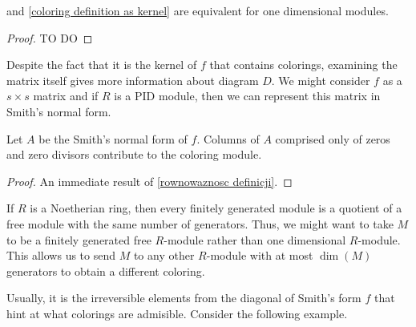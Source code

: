 \begin{corollary}\label{rownowaznosc definicji}
   and \cref{coloring definition as kernel} are equivalent for one dimensional modules.
\end{corollary}

\begin{proof}
  {\large\color{red}TO DO}
\end{proof}

Despite the fact that it is the kernel of $f$ that contains colorings, examining the matrix itself gives more information about diagram $D$. We might consider $f$ as a $s\times s$ matrix and if $R$ is a PID module, then we can represent this matrix in Smith's normal form. 

\begin{proposition}
  Let $A$ be the Smith's normal form of $f$. Columns of $A$ comprised only of zeros and zero divisors contribute to the coloring module.
\end{proposition}

\begin{proof}
  An immediate result of \cref{rownowaznosc definicji}.
\end{proof}


If $R$ is a Noetherian ring, then every finitely generated module is a quotient of a free module with the same number of generators. Thus, we might want to take $M$ to be a finitely generated free $R$-module rather than one dimensional $R$-module. This allows us to send $M$ to any other $R$-module with at most $\dim (M)$ generators to obtain a different coloring.

Usually, it is the irreversible elements from the diagonal of Smith's form $f$ that hint at what colorings are admisible. Consider the following example.

